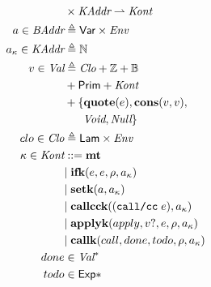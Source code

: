 \documentclass[12pt,draft]{article}
\newcommand{\callccsyn}[1]{(\texttt{call/cc}\;#1)}
\begin{document}
\begin{multicols*}{2}
\begin{align*}
    & \times \cKAddr \rightharpoonup \cKont \\
    a \in \cBAddr &\triangleq \cVar \times \cEnv \\
    \ckaddr \in \cKAddr &\triangleq \mathbb{N} \\
    v \in \cVal &\triangleq \cClo + \mathbb{Z} + \mathbb{B} \\
                        & + \cPrim + \cKont \\
                        & + \{\textbf{quote}(e) , \textbf{cons}(v , v) , \\
                        & \;\;\;\;\;\; \textit{Void} , \textit{Null} \} \\
    clo \in \cClo &\triangleq \cLam \times \cEnv \\
    \ckont \in \cKont &::= \textbf{mt} \\
                        &|\; \textbf{ifk}(e , e , \cenv , \ckaddr) \\
                        &|\; \textbf{setk}(a, \ckaddr) \\
                        &|\; \textbf{callcck}(\callccsyn{e} , \ckaddr) \\
                        &|\; \textbf{applyk}(apply, v? , e , \cenv , \ckaddr) \\
                        &|\; \textbf{callk}(call,done,todo,\cenv,\ckaddr) \\
    done &\in \cVal^* \\
    todo &\in \cExp* \\
  \end{align*}
\end{multicols*}


\newpage
\end{document}
